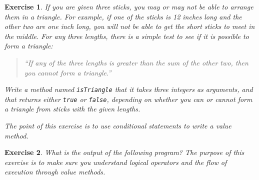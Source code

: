 \documentclass[12pt]{book}
\theoremstyle{exercise}
\newtheorem{exercise}{Exercise}[chapter]
\begin{document}
\begin{exercise}
If you are given three sticks, you may or may not be able to arrange them in a triangle.
For example, if one of the sticks is 12 inches long and the other two are one inch long, you will not be able to get the short sticks to meet in the middle.
For any three lengths, there is a simple test to see if it is possible to form a triangle:

\begin{quotation}
``If any of the three lengths is greater than the sum of the other two, then you cannot form a triangle.''
\end{quotation}

Write a method named {\tt isTriangle} that it takes three integers as arguments, and that returns either {\tt true} or {\tt false}, depending on whether you can or cannot form a triangle from sticks with the given lengths.

The point of this exercise is to use conditional statements to write a value method.
\end{exercise}

\begin{exercise}
What is the output of the following program?
The purpose of this exercise is to make sure you understand logical operators and the flow of execution through value methods.

\end{exercise}
\end{document}
